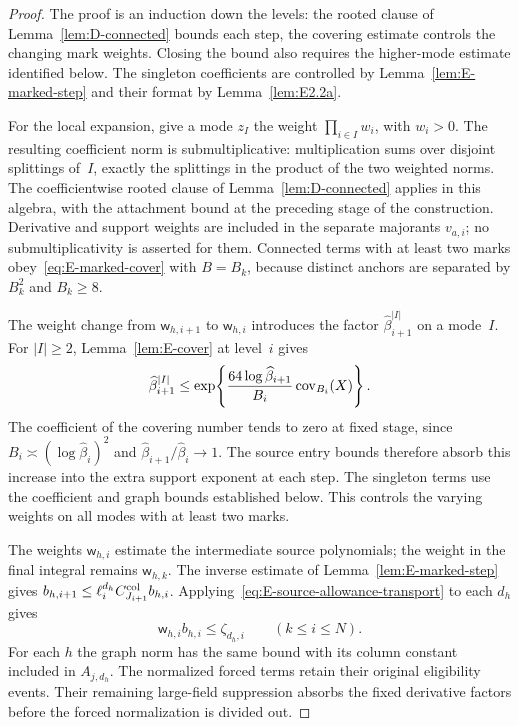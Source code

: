 \begin{proof}
The proof is an induction down the levels: the rooted clause of Lemma~\ref{lem:D-connected} bounds each step, the covering estimate controls the changing mark weights. Closing the bound also requires the higher-mode estimate identified below. The singleton coefficients are controlled by Lemma~\ref{lem:E-marked-step} and their format by Lemma~\ref{lem:E2.2a}.

For the local expansion, give a mode $z_I$ the weight $\prod_{i\in I}w_i$, with $w_i>0$. The resulting coefficient norm is submultiplicative: multiplication sums over disjoint splittings of~$I$, exactly the splittings in the product of the two weighted norms. The coefficientwise rooted clause of Lemma~\ref{lem:D-connected} applies in this algebra, with the attachment bound at the preceding stage of the construction. Derivative and support weights are included in the separate majorants $v_{a,i}$; no submultiplicativity is asserted for them. Connected terms with at least two marks obey~\eqref{eq:E-marked-cover} with $B=B_k$, because distinct anchors are separated by $B_k^2$ and $B_k\ge8$.

The weight change from $\mathsf w_{h,i+1}$ to $\mathsf w_{h,i}$ introduces the factor $\widehat\beta_{i+1}^{|I|}$ on a mode~$I$. For $|I|\ge2$, Lemma~\ref{lem:E-cover} at level~$i$ gives
\begin{equation*}
 \widehat\beta_{i+1}^{|I|}
 \le\exp\!\left\{\frac{64\log\widehat\beta_{i+1}}{B_i}
                        \operatorname{cov}_{B_i}(X)\right\}.
\end{equation*}
The coefficient of the covering number tends to zero at fixed stage, since $B_i\asymp(\log\widehat\beta_i)^2$ and $\widehat\beta_{i+1}/\widehat\beta_i\to1$. The source entry bounds therefore absorb this increase into the extra support exponent at each step. The singleton terms use the coefficient and graph bounds established below. This controls the varying weights on all modes with at least two marks.

The weights $\mathsf w_{h,i}$ estimate the intermediate source polynomials; the weight in the final integral remains $\mathsf w_{h,k}$. The inverse estimate of Lemma~\ref{lem:E-marked-step} gives $b_{h,i+1}\le\ell_i^{d_h} C^{\rm col}_{J_{i+1}}b_{h,i}$. Applying~\eqref{eq:E-source-allowance-transport} to each $d_h$ gives
\begin{equation*}
 \mathsf w_{h,i}b_{h,i}\le\zeta_{d_h,i}\qquad(k\le i\le N).
\end{equation*}
For each $h$ the graph norm has the same bound with its column constant included in $A_{j,d_h}$. The normalized forced terms retain their original eligibility events. Their remaining large-field suppression absorbs the fixed derivative factors before the forced normalization is divided out.


\end{proof}

